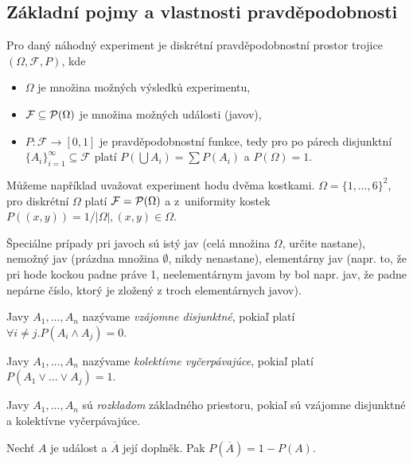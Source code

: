 {\subsection{Základní pojmy a vlastnosti pravděpodobnosti}

\begin{definition}
Pro daný náhodný experiment je diskrétní pravděpodobnostní prostor trojice
$(\Omega, \mathcal{F}, P)$,
kde
\begin{itemize}
    \item $\Omega$ je množina možných výsledků experimentu,
    \item $\mathcal{F} \subseteq \mathcal{P}(\Omega)$ je množina možných události (javov),
    \item $P : \mathcal{F} \to [0,1]$ je pravděpodobnostní funkce, tedy
        pro po párech disjunktní $\{A_i\}_{i=1}^\infty \subseteq \mathcal{F}$ platí
        $P(\bigcup A_i) = \sum P(A_i)$ a $P(\Omega) = 1$.
\end{itemize}
\end{definition}

\begin{example}
    Můžeme například uvažovat experiment hodu dvěma kostkami.
    $\Omega = \{1,\ldots,6\}^2$, pro diskrétní $\Omega$ platí
    $\mathcal{F} = \mathcal{P}(\Omega)$ a z~uniformity kostek
    $P((x,y)) = 1/\lvert \Omega \rvert, (x,y) \in \Omega$.
\end{example}

Špeciálne prípady pri javoch sú istý jav (celá množina $\Omega$, určite nastane),
nemožný jav (prázdna množina $\emptyset$, nikdy nenastane),
elementárny jav (napr. to, že pri hode kockou padne práve 1,
neelementárnym javom by bol napr. jav, že padne nepárne číslo,
ktorý je zložený z troch elementárnych javov).

\begin{definition}
	Javy $A_1, \ldots, A_n$ nazývame {\em vzájomne disjunktné}, 
	pokiaľ platí $\forall i \neq j.P(A_i \land A_j)=0$.
	
	Javy $A_1, \ldots, A_n$ nazývame {\em kolektívne vyčerpávajúce}, %
	pokiaľ platí $P(A_1 \lor \ldots \lor A_j)=1$.
	
	Javy $A_1, \ldots, A_n$ sú {\em rozkladom} základného priestoru,
	pokiaľ sú vzájomne disjunktné a kolektívne vyčerpávajúce.
\end{definition}

\begin{claim}
    Nechť $A$ je událost a $\overline{A}$ její doplněk. Pak
    $P(\overline{A}) = 1 - P(A)$.
\end{claim}

}
